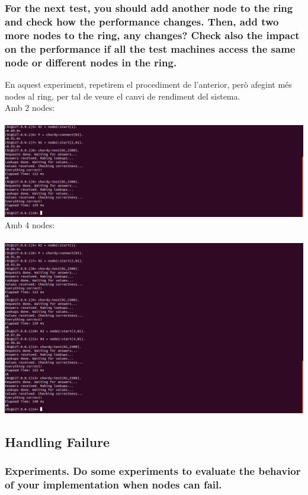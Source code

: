 \documentclass[a4paper, 10pt]{article}
\begin{document}
\subsubsection{For the next test, you should add another node to the ring and check how the performance changes. Then, add two more nodes to the ring, any changes? Check also the impact on the performance if all the test machines access the same node or different nodes in the ring.}

En aquest experiment, repetirem el procediment de l'anterior, però afegint més nodes al ring, per tal de veure el canvi de rendiment del sistema.\\
Amb 2 nodes:\\\\
\includegraphics[width=\textwidth]{Ex4.png}\\
Amb 4 nodes:\\\\
\includegraphics[width=\textwidth]{Ex5.png}
\newpage
\subsection{Handling Failure}
\subsubsection{Experiments. Do some experiments to evaluate the behavior of your implementation when nodes can fail.}
\end{document}
